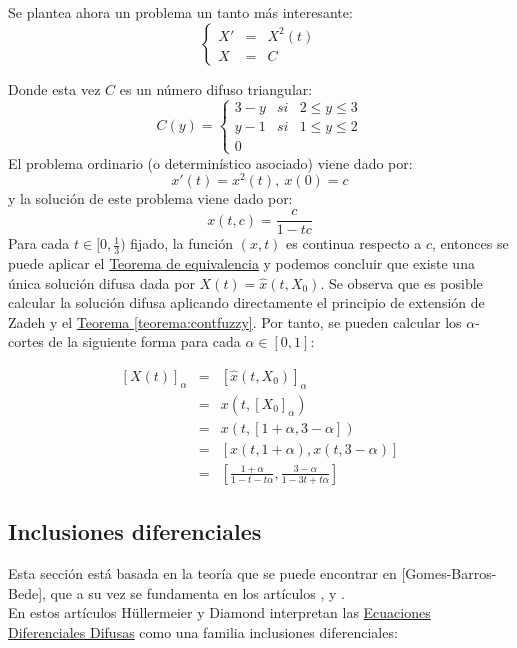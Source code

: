 \begin{ejemplo}
	Se plantea ahora un problema un tanto más interesante:
	\[
		\left\{
			\begin{array}{ccc}
				X' & = & X^2(t) \\
				X & =  & C
			\end{array}
		\right.
	\]
	
	Donde esta vez $C$ es un número difuso triangular:
	\[
		C(y) = \left\{
			\begin{array}{ccc}
				3 - y & si & 2 \leq y \leq 3 \\
				y - 1 & si & 1 \leq y \leq 2 \\
				0 
			\end{array}
		\right.
	\]
	El problema ordinario (o determinístico asociado) viene dado por:
	\[
		x'(t) = x^2(t), ~ x(0) = c
	\]
	y la solución de este problema viene dado por:
	\[
		x(t, c) = \frac{c}{1-tc}
	\]
	Para cada $t \in [0, \frac{1}{3})$ fijado, la función $(x, t)$ es continua respecto a $c$, entonces se puede aplicar el \hyperref[teorema:equivalencia]{Teorema de equivalencia} y podemos concluir que existe una única solución difusa dada por $X(t) = \hat{x}(t, X_0)$. Se observa que es posible calcular la solución difusa aplicando directamente el principio de extensión de Zadeh y el \hyperref[teorema:contfuzzy]{Teorema \ref*{teorema:contfuzzy}}. Por tanto, se pueden calcular los $\alpha$-cortes de la siguiente forma para cada $\alpha \in [0, 1]$:
	
	\[
		\begin{array}{ccc}
			[X(t)]_\alpha & = & [\hat{x}(t, X_0)]_\alpha \\
			& = & x(t, [X_0]_\alpha) \\
			& = & x(t, [1+\alpha, 3-\alpha]) \\
			& = & [x(t, 1+\alpha), x(t, 3-\alpha)] \\
			& = & \left[
				\frac{1+\alpha}{1-t-t\alpha}, \frac{3-\alpha}{1-3t + t\alpha}
			\right]
		\end{array}
	\]
\end{ejemplo}

\subsection{Inclusiones diferenciales}
Esta sección está basada en la teoría que se puede encontrar en [Gomes-Barros-Bede], que a su vez se fundamenta en los artículos  \cite{inclusionesdif1}, \cite{inclusionesdif2} y \cite{inclusionesdif3}.\\
En estos artículos Hüllermeier y Diamond interpretan las  \hyperref[def:edf]{Ecuaciones Diferenciales Difusas} como una familia inclusiones diferenciales:

